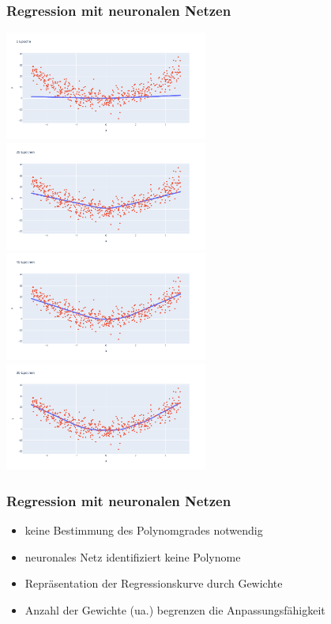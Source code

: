 \begin{frame}
\frametitle{Regression mit neuronalen Netzen}

\begin{center}
	\includegraphics[width=0.5\textwidth]{fig8/nn_e1.png}%
	\includegraphics[width=0.5\textwidth]{fig8/nn_e20.png}
	\includegraphics[width=0.5\textwidth]{fig8/nn_e40.png}%
	\includegraphics[width=0.5\textwidth]{fig8/nn_e80.png}
\end{center}
	
\end{frame}


\begin{frame}
\frametitle{Regression mit neuronalen Netzen}

\begin{itemize}
	\item keine Bestimmung des Polynomgrades notwendig
	\item neuronales Netz identifiziert keine Polynome
	\item Repräsentation der Regressionskurve durch Gewichte
	\item Anzahl der Gewichte (ua.) begrenzen die Anpassungsfähigkeit
\end{itemize}

\end{frame}

